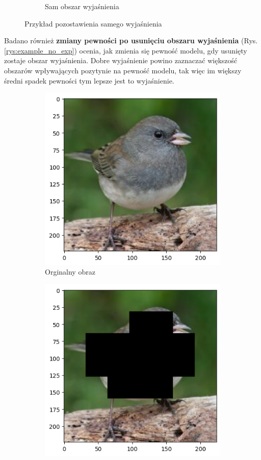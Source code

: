 \begin{figure}[h]
\begin{subfigure}[b]{0.45\textwidth}
		\caption{Sam obszar wyjaśnienia}
	\end{subfigure}
	\caption{Przykład pozostawienia samego wyjaśnienia}
	\label{rys:example_only_exp}
\end{figure}

Badano również \textbf{zmiany pewności po usunięciu obszaru wyjaśnienia} (Rys. \ref{rys:example_no_exp}) ocenia, jak zmienia się pewność modelu, gdy usunięty zostaje obszar wyjaśnienia.
Dobre wyjaśnienie powino zaznaczać większość obszarów wpływających pozytynie na pewność modelu, tak więc im większy średni spadek pewności tym lepsze jest to wyjaśnienie.

\begin{figure}[h]
	\begin{subfigure}[b]{0.45\textwidth}
		\centering\includegraphics[width=.9\textwidth]{img/parameters/quality/base}
		\caption{Orginalny obraz}
	\end{subfigure}
	\begin{subfigure}[b]{0.45\textwidth}
		\centering\includegraphics[width=.9\textwidth]{img/parameters/quality/wo_mask}

\end{subfigure}
\end{figure}
